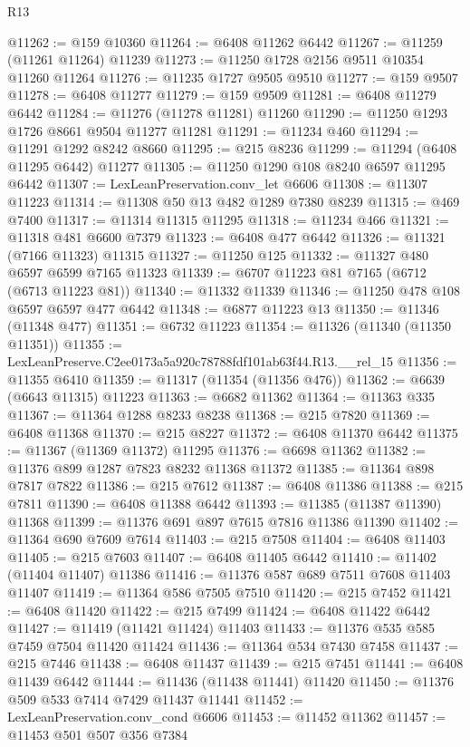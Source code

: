 \begin{lexlean}{R13}
\begin{coremodule}
@11262 := @159 @10360
@11264 := @6408 @11262 @6442
@11267 := @11259 (@11261 @11264) @11239
@11273 := @11250 @1728 @2156 @9511 @10354 @11260 @11264
@11276 := @11235 @1727 @9505 @9510
@11277 := @159 @9507
@11278 := @6408 @11277
@11279 := @159 @9509
@11281 := @6408 @11279 @6442
@11284 := @11276 (@11278 @11281) @11260
@11290 := @11250 @1293 @1726 @8661 @9504 @11277 @11281
@11291 := @11234 @460
@11294 := @11291 @1292 @8242 @8660
@11295 := @215 @8236
@11299 := @11294 (@6408 @11295 @6442) @11277
@11305 := @11250 @1290 @108 @8240 @6597 @11295 @6442
@11307 := LexLeanPreservation.conv_let @6606
@11308 := @11307 @11223
@11314 := @11308 @50 @13 @482 @1289 @7380 @8239
@11315 := @469 @7400
@11317 := @11314 @11315 @11295
@11318 := @11234 @466
@11321 := @11318 @481 @6600 @7379
@11323 := @6408 @477 @6442
@11326 := @11321 (@7166 @11323) @11315
@11327 := @11250 @125
@11332 := @11327 @480 @6597 @6599 @7165 @11323
@11339 := @6707 @11223 @81 @7165 (@6712 (@6713 @11223 @81))
@11340 := @11332 @11339
@11346 := @11250 @478 @108 @6597 @6597 @477 @6442
@11348 := @6877 @11223 @13
@11350 := @11346 (@11348 @477)
@11351 := @6732 @11223
@11354 := @11326 (@11340 (@11350 @11351))
@11355 := LexLeanPreserve.C2ee0173a5a920c78788fdf101ab63f44.R13.__rel_15
@11356 := @11355 @6410
@11359 := @11317 (@11354 (@11356 @476))
@11362 := @6639 (@6643 @11315) @11223
@11363 := @6682 @11362
@11364 := @11363 @335
@11367 := @11364 @1288 @8233 @8238
@11368 := @215 @7820
@11369 := @6408 @11368
@11370 := @215 @8227
@11372 := @6408 @11370 @6442
@11375 := @11367 (@11369 @11372) @11295
@11376 := @6698 @11362
@11382 := @11376 @899 @1287 @7823 @8232 @11368 @11372
@11385 := @11364 @898 @7817 @7822
@11386 := @215 @7612
@11387 := @6408 @11386
@11388 := @215 @7811
@11390 := @6408 @11388 @6442
@11393 := @11385 (@11387 @11390) @11368
@11399 := @11376 @691 @897 @7615 @7816 @11386 @11390
@11402 := @11364 @690 @7609 @7614
@11403 := @215 @7508
@11404 := @6408 @11403
@11405 := @215 @7603
@11407 := @6408 @11405 @6442
@11410 := @11402 (@11404 @11407) @11386
@11416 := @11376 @587 @689 @7511 @7608 @11403 @11407
@11419 := @11364 @586 @7505 @7510
@11420 := @215 @7452
@11421 := @6408 @11420
@11422 := @215 @7499
@11424 := @6408 @11422 @6442
@11427 := @11419 (@11421 @11424) @11403
@11433 := @11376 @535 @585 @7459 @7504 @11420 @11424
@11436 := @11364 @534 @7430 @7458
@11437 := @215 @7446
@11438 := @6408 @11437
@11439 := @215 @7451
@11441 := @6408 @11439 @6442
@11444 := @11436 (@11438 @11441) @11420
@11450 := @11376 @509 @533 @7414 @7429 @11437 @11441
@11452 := LexLeanPreservation.conv_cond @6606
@11453 := @11452 @11362
@11457 := @11453 @501 @507 @356 @7384

\end{coremodule}
\end{lexlean}
